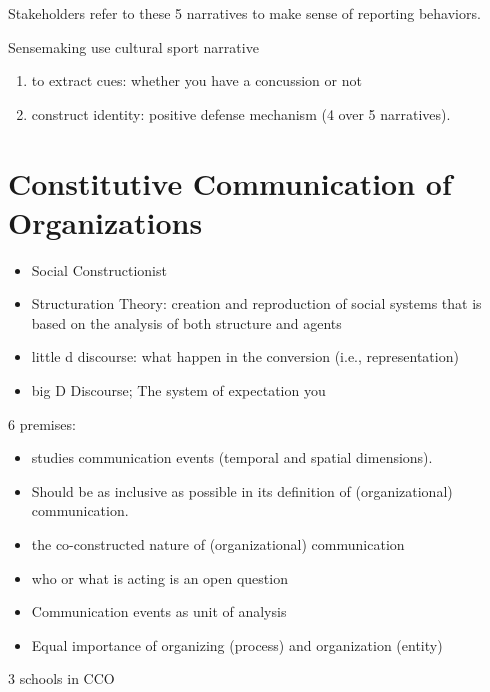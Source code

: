 \documentclass[
]{book}
\providecommand{\tightlist}{%
  \setlength{\itemsep}{0pt}\setlength{\parskip}{0pt}}
\begin{document}
Stakeholders refer to these 5 narratives to make sense of reporting behaviors.

Sensemaking use cultural sport narrative

\begin{enumerate}
\def\labelenumi{\arabic{enumi}.}
\tightlist
\item
  to extract cues: whether you have a concussion or not
\item
  construct identity: positive defense mechanism (4 over 5 narratives).
\end{enumerate}

\hypertarget{constitutive-communication-of-organizations}{%
\chapter{Constitutive Communication of Organizations}\label{constitutive-communication-of-organizations}}

\begin{itemize}
\tightlist
\item
  Social Constructionist
\item
  Structuration Theory: creation and reproduction of social systems that is based on the analysis of both structure and agents
\item
  little d discourse: what happen in the conversion (i.e., representation)
\item
  big D Discourse; The system of expectation you
\end{itemize}

\citep{Schoeneborn_2017}

6 premises:

\begin{itemize}
\tightlist
\item
  studies communication events (temporal and spatial dimensions).
\item
  Should be as inclusive as possible in its definition of (organizational) communication.
\item
  the co-constructed nature of (organizational) communication
\item
  who or what is acting is an open question
\item
  Communication events as unit of analysis
\item
  Equal importance of organizing (process) and organization (entity)
\end{itemize}

3 schools in CCO
\end{document}
